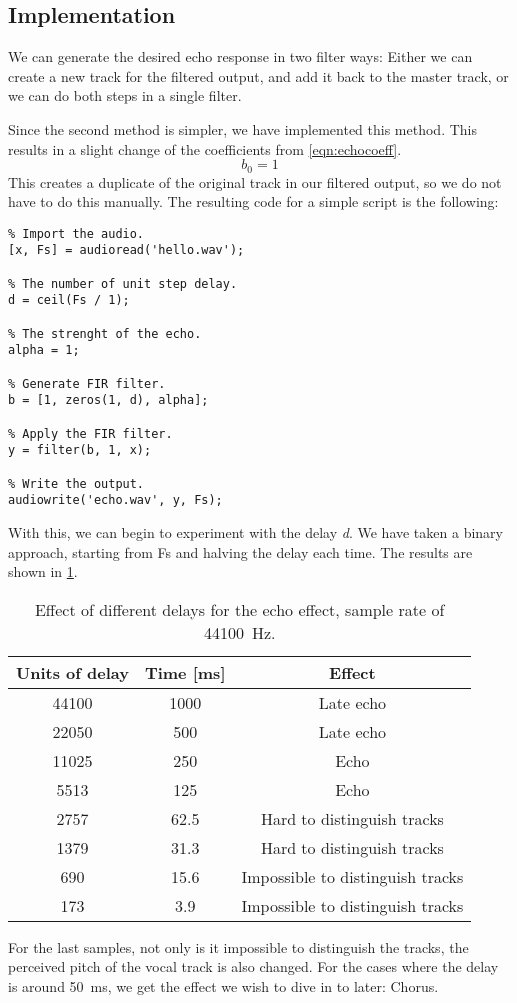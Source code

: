 
\subsection{Implementation}
We can generate the desired echo response in two filter ways: Either we can create a new track for the filtered output, and add it back to the master track, or we can do both steps in a single filter.

Since the second method is simpler, we have implemented this method. This results in a slight change of the coefficients from \cref{eqn:echocoeff}.
\begin{equation}
b_{0} = 1
\end{equation}
This creates a duplicate of the original track in our filtered output, so we do not have to do this manually. The resulting code for a simple script is the following:
\begin{listing}
\begin{verbatim}
% Import the audio.
[x, Fs] = audioread('hello.wav');  

% The number of unit step delay.
d = ceil(Fs / 1);

% The strenght of the echo.
alpha = 1;

% Generate FIR filter.
b = [1, zeros(1, d), alpha];

% Apply the FIR filter.
y = filter(b, 1, x);

% Write the output.
audiowrite('echo.wav', y, Fs);
\end{verbatim}
\end{listing}

With this, we can begin to experiment with the delay \emph{d}. We have taken a binary approach, starting from Fs and halving the delay each time. The results are shown in \cref{tbl:echo}.
\begin{table}[!hbt]
\centering
\begin{tabular}{ccc}
	\toprule
	Units of delay & Time [ms] & Effect \\ 
	\midrule
	44100 & 1000 & Late echo \\ 
	22050 & 500 & Late echo \\ 
	11025 & 250 & Echo \\ 
	5513 & 125 & Echo \\ 
	2757 & 62.5 & Hard to distinguish tracks \\ 
	1379 & 31.3 & Hard to distinguish tracks \\ 
	690 & 15.6 & Impossible to distinguish tracks \\ 
	173 & 3.9 & Impossible to distinguish tracks \\ 
	\bottomrule
\end{tabular}
\caption{Effect of different delays for the echo effect, sample rate of \SI{44100}{\hertz}.}
\label{tbl:echo}
\end{table}
For the last samples, not only is it impossible to distinguish the tracks, the perceived pitch of the vocal track is also changed. For the cases where the delay is around \SI{50}{\milli\second}, we get the effect we wish to dive in to later: Chorus.
